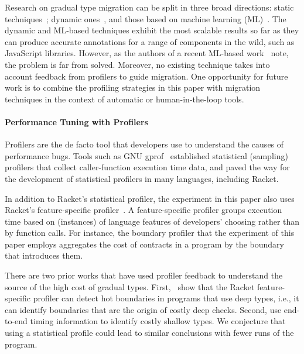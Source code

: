Research on gradual type migration can be split in three broad directions:
static techniques~\cite{rch:in-out-infer-gt, km:ts-type-evo,
mp:gt-decidable, ccew:gt-migrate, gc:gt-infer,
cagg-solver-based-migration,clps-popl-2020,js-infer,ruby-static-infer,unif-infer};
dynamic
ones~\cite{msi:gt-infer-hm, dyn-infer-ruby, profile-guided-typing, gen-ts-decl, jstrace},
and those based on machine learning
(ML)~\cite{lambdanet,nl2ptype,learn-types-big-data,ml-ts}. The dynamic
and ML-based techniques exhibit the most scalable results so far as they
can produce accurate annotations for a range of components in the wild,
such as JavaScript libraries. However, as the authors of a recent
ML-based work~\cite{ml-ts} note, the problem is far from solved.
Moreover, no existing technique takes into account feedback from profilers to
guide migration.
One opportunity for future work is to combine the profiling strategies in this
paper with migration techniques in the context of automatic or
human-in-the-loop tools.
 
\paragraph{Performance Tuning with Profilers} Profilers are the de facto
tool that developers use to understand the causes of performance bugs. 
Tools such as GNU gprof~\cite{gprof} established statistical (sampling) 
profilers that collect caller-function execution time data, and paved the
way for the development of statistical profilers in many languages,
including Racket.

In addition to Racket's statistical profiler, the experiment in this
paper also uses Racket's feature-specific
profiler~\cite{astavf-feature-prf, staaf-feature-prf}. A
feature-specific profiler
groups execution time based on (instances) of language features of
developers' choosing rather than by function calls.  For instance, the
boundary profiler that the experiment of this paper employs aggregates
the cost of contracts in a program by the boundary that introduces
them.

There are two prior works that have used profiler feedback to understand
the source of the high cost of gradual types.
First,~\citet{astavf-feature-prf} show that the Racket feature-specific profiler can detect
hot boundaries in programs that use deep types, i.e., it can
identify boundaries that are the origin of costly deep checks.
Second, \citet{grmhn-vmil-2019} use end-to-end timing information
to identify costly shallow types.
We conjecture that using a statistical profile could lead to similar
conclusions with fewer runs of the program.

